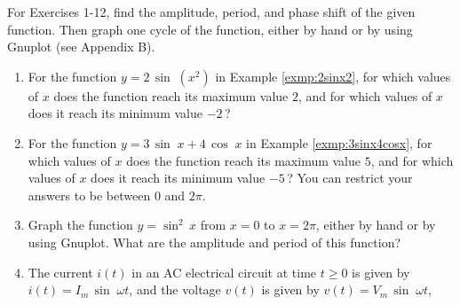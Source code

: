 \startexercises\label{sec5dot2}
\vspace{5mm}
{\small
\par\noindent For Exercises 1-12, find the amplitude, period, and phase shift of the given function.
Then graph one cycle of the function, either by hand or by using Gnuplot (see Appendix B).
\begin{enumerate}[\bfseries 1.]
 \item For the function $y=2\,\sin\;( x^2 )$ in Example \ref{exmp:2sinx2}, for which values of $x$
  does the function reach its maximum value $2$, and for which values of $x$ does it reach
  its minimum value $-2\,$?
 \item For the function $y=3\,\sin\;x + 4\,\cos\;x$ in Example \ref{exmp:3sinx4cosx}, for which
  values of $x$ does the function reach its maximum value $5$, and for which values of $x$ does it
  reach its minimum value $-5\,$? You can restrict your answers to be between $0$ and $2\pi$.
 \item Graph the function $y=\sin^2 \,x$ from $x=0$ to $x=2\pi$, either by hand or by using Gnuplot.
  What are the amplitude and period of this function?
 \item\label{exer:circuitphase}
  The current $i(t)$ in an AC electrical circuit at time $t\ge 0$ is given by
  $i(t) = I_m \,\sin\;\omega t$, and the voltage $v(t)$ is given by $v(t) = V_m \,\sin\;\omega t$,

\end{enumerate}}

